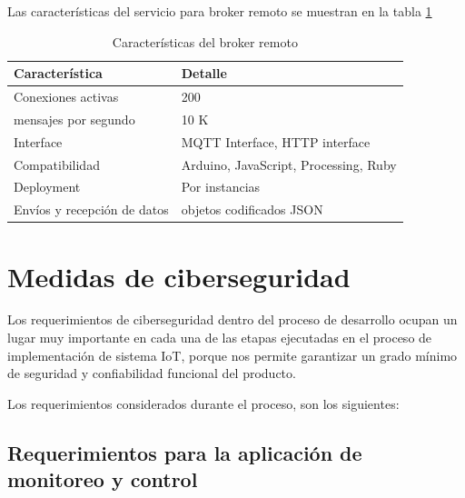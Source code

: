 \vspace{0.5cm}
Las características del servicio para broker remoto se muestran en la tabla  \ref{tab:brokerremoto}

\begin{table}[h]
	\centering
	\caption[Características del broker remoto]{Características del broker remoto}
	\begin{tabular}{p{5cm} p{7cm} }    
		\toprule
		\textbf{Característica} 	 & \textbf{Detalle}  \\
		\midrule
		Conexiones activas  & 200\\		
		mensajes por segundo & 10 K \\
		Interface  & MQTT Interface, HTTP interface\\		
		Compatibilidad & Arduino, JavaScript, Processing, Ruby \\		
		Deployment 	  & Por instancias\\
		Envíos y recepción de datos & objetos codificados JSON\\
		
		\bottomrule
		\hline
	\end{tabular}
	\label{tab:brokerremoto}
\end{table}


\section{Medidas de ciberseguridad}

Los requerimientos de ciberseguridad dentro del proceso de desarrollo ocupan un lugar muy importante en cada una de las etapas ejecutadas en el proceso de implementación de sistema IoT, porque nos permite garantizar un grado mínimo de seguridad y confiabilidad funcional del producto. 

Los requerimientos considerados durante el proceso, son los siguientes:

\subsection{Requerimientos para la aplicación de monitoreo y control}

